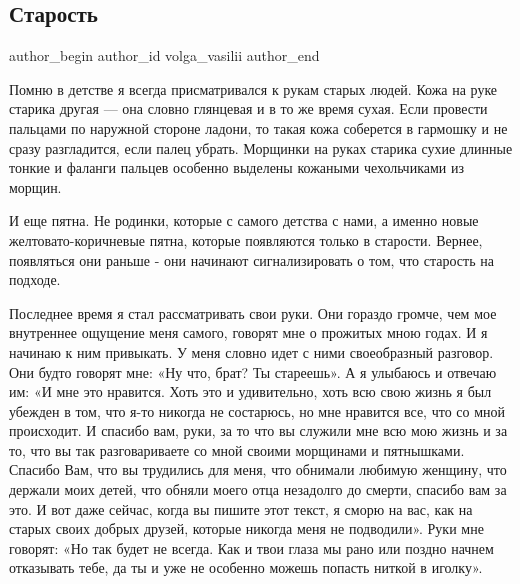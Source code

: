  
 
 
 
 
 
\subsection{Старость}
\label{sec:01_12_2020.fb.volga_vasilii.1.starost}
\ifcmt
	author_begin
   author_id volga_vasilii
	author_end
\fi

Помню в детстве я всегда присматривался к рукам старых людей. Кожа на руке
старика другая --- она словно глянцевая и в то же время сухая. Если провести
пальцами по наружной стороне ладони, то такая кожа соберется в гармошку и не
сразу разгладится, если палец убрать. Морщинки на руках старика сухие длинные
тонкие и фаланги пальцев особенно выделены кожаными чехольчиками из морщин. 

И еще пятна. Не родинки, которые с самого детства с нами, а именно новые
желтовато-коричневые пятна, которые появляются только в старости. Вернее,
появляться они раньше - они начинают сигнализировать о том, что старость на
подходе. 

Последнее время я стал рассматривать свои руки. Они гораздо громче, чем мое
внутреннее ощущение меня самого, говорят мне о прожитых мною годах. И я начинаю
к ним привыкать. У меня словно идет с ними своеобразный разговор. Они будто
говорят мне: «Ну что, брат? Ты стареешь». А я улыбаюсь и отвечаю им: «И мне это
нравится. Хоть это и удивительно, хоть всю свою жизнь я был убежден в том, что
я-то никогда не состарюсь, но мне нравится все, что со мной происходит. И
спасибо вам, руки, за то что вы служили мне всю мою жизнь и за то, что вы так
разговариваете со мной своими морщинами и пятнышками. Спасибо Вам, что вы
трудились для меня, что обнимали любимую женщину, что держали моих детей, что
обняли моего отца незадолго до смерти, спасибо вам за это. И вот даже сейчас,
когда вы пишите этот текст, я сморю на вас, как на старых своих добрых друзей,
которые никогда меня не подводили». Руки мне говорят: «Но так будет не всегда.
Как и твои глаза мы рано или поздно начнем отказывать тебе, да ты и уже не
особенно можешь попасть ниткой в иголку».  

